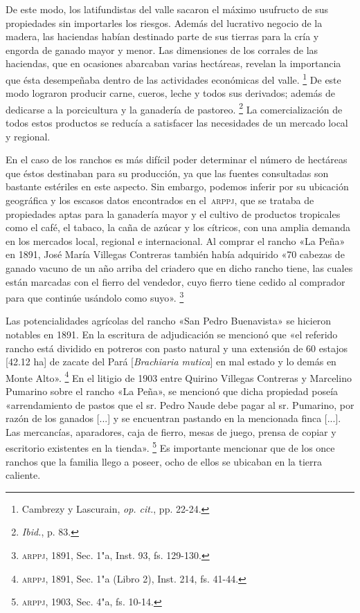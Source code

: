 \documentclass[14pt,twoside,final]{extbook} %
\let\oldfootnote\footnote
\renewcommand\footnote[1]{%
\oldfootnote{\hspace{1mm}#1}}
\begin{document}
De este modo, los latifundistas del valle sacaron el máximo usufructo de sus propiedades sin importarles los riesgos. Además del lucrativo negocio de la madera, las haciendas habían destinado parte de sus tierras para la cría y engorda de ganado mayor y menor. Las dimensiones de los corrales de las haciendas, que en ocasiones abarcaban varias hectáreas, revelan la importancia que ésta desempeñaba dentro de las actividades económicas del valle.\footnote{Cambrezy y Lascurain, \emph{op. cit.}, pp. 22-24.} De este modo lograron producir carne, cueros, leche y todos sus derivados; además de dedicarse a la porcicultura y la ganadería de pastoreo.\footnote{\emph{Ibid.}, p. 83.} La comercialización de todos estos productos se reducía a satisfacer las necesidades de un mercado local y regional.

En el caso de los ranchos es más difícil poder determinar el número de hectáreas que éstos destinaban para su producción, ya que las fuentes consultadas son bastante estériles en este aspecto. Sin embargo, podemos inferir por su ubicación geográfica y los escasos datos encontrados en el~\textsc{arppj}, que se trataba de propiedades aptas para la ganadería mayor y el cultivo de productos tropicales como el café, el tabaco, la caña de azúcar y los cítricos, con una amplia demanda en los mercados local, regional e internacional. Al comprar el rancho «La Peña» en 1891, José María Villegas Contreras también había adquirido «70 cabezas de ganado vacuno de un año arriba del criadero que en dicho rancho tiene, las cuales están marcadas con el fierro del vendedor, cuyo fierro tiene cedido al comprador para que continúe usándolo como suyo».\footnote{\textsc{arppj}, 1891, Sec. 1"a, Inst. 93, fs. 129-130.}

Las potencialidades agrícolas del rancho «San Pedro Buenavista» se hicieron notables en 1891. En la escritura de adjudicación se mencionó que «el referido rancho está dividido en potreros con pasto natural y una extensión de 60 estajos [42.12 ha] de zacate del Pará [\emph{Brachiaria mutica}] en mal estado y lo demás en Monte Alto».\footnote{\textsc{arppj}, 1891, Sec. 1"a (Libro 2), Inst. 214, fs. 41-44.} En el litigio de 1903 entre Quirino Villegas Contreras y Marcelino Pumarino sobre el rancho «La Peña», se mencionó que dicha propiedad poseía «arrendamiento de pastos que el sr. Pedro Naude debe pagar al sr. Pumarino, por razón de los ganados [...] y se encuentran pastando en la mencionada finca [...]. Las mercancías, aparadores, caja de fierro, mesas de juego, prensa de copiar y escritorio existentes en la tienda».\footnote{\textsc{arppj}, 1903, Sec. 4"a, fs. 10-14.} Es importante mencionar que de los once ranchos que la familia llego a poseer, ocho de ellos se ubicaban en la tierra caliente.
\end{document}
